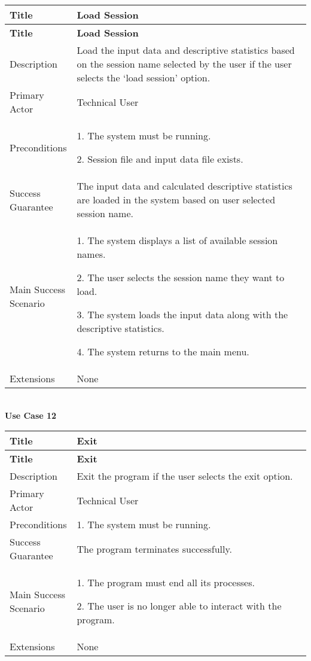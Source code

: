     \begin{longtable}{|p{0.227\linewidth}|p{0.773\linewidth}|}
    \hline
    \textbf{Title} & \textbf{Load Session} \\
    \hline
    \endfirsthead
    \hline
    \textbf{Title} & \textbf{Load Session} \\
    \hline
    \endhead
    \hline
    \endfoot
    \hline
    \endlastfoot
    Description & Load the input data and descriptive statistics based on
    the session name selected by the user if the user selects the `load
    session' option. \\ \hline
    Primary Actor & Technical User \\ \hline
    Preconditions & 1. The system must be running.
    
    2. Session file and input data file exists. \\ \hline
    Success Guarantee & The input data and calculated descriptive statistics
    are loaded in the system based on user selected session name. \\ \hline
    Main Success Scenario & 1. The system displays a list of available
    session names.
    
    2. The user selects the session name they want to load.
    
    3. The system loads the input data along with the descriptive
    statistics.
    
    4. The system returns to the main menu. \\ \hline
    Extensions & None
    \end{longtable}

    \strut \\
    \textbf{\large Use Case 12}
    
    \begin{longtable}{|p{0.227\linewidth}|p{0.773\linewidth}|}
    \hline
    \textbf{Title} & \textbf{Exit} \\
    \hline
    \endfirsthead
    \hline
    \textbf{Title} & \textbf{Exit} \\
    \hline
    \endhead
    \hline
    \endfoot
    \hline
    \endlastfoot
    Description & Exit the program if the user selects the exit option. \\ \hline
    Primary Actor & Technical User \\ \hline
    Preconditions & 1. The system must be running. \\ \hline
    Success Guarantee & The program terminates successfully. \\ \hline
    Main Success Scenario & 1. The program must end all its processes.
    
    2. The user is no longer able to interact with the program. \\ \hline
    Extensions & None
    \end{longtable}
    